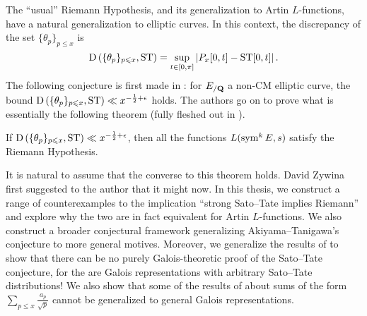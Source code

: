 The ``usual'' Riemann Hypothesis, and its generalization to Artin 
$L$-functions, have a natural generalization to elliptic curves. In this 
context, the discrepancy of the set $\{\theta_p\}_{p\leqslant x}$ is 
\[
	\operatorname{D}\left(\{\theta_p\}_{p\leqslant x},\mathrm{ST}\right) = \sup_{t\in [0,\pi]} \left| P_x[0,t] - \mathrm{ST}[0,t]\right| .
\]
The following conjecture is first made in \cite{akiyama-tanigawa-1999}: for 
$E_{/\mathbf{Q}}$ a non-CM elliptic curve, the bound 
$\operatorname{D}\left(\{\theta_p\}_{p\leqslant x},\mathrm{ST}\right)\ll x^{-\frac 1 2+\epsilon}$ 
holds. The authors go on to prove what is essentially the following theorem 
(fully fleshed out in \cite{mazur-2008}). 

\begin{theorem}
If $\operatorname{D}\left(\{\theta_p\}_{p\leqslant x},\mathrm{ST}\right)\ll x^{-\frac 1 2+\epsilon}$, 
then all the functions $L(\operatorname{sym}^k E, s)$ satisfy the Riemann Hypothesis. 
\end{theorem}

It is natural to assume that the converse to this theorem holds. David Zywina 
first suggested to the author that it might now. In this thesis, we construct a 
range of counterexamples to the implication ``strong Sato--Tate implies 
Riemann'' and explore why the two are in fact equivalent for Artin 
$L$-functions. We also construct a broader conjectural framework generalizing 
Akiyama--Tanigawa's conjecture to more general motives. Moreover, we generalize 
the results of \cite{pande-2011} to show that there can be no purely 
Galois-theoretic proof of the Sato--Tate conjecture, for the are Galois 
representations with arbitrary Sato--Tate distributions! We also show that 
some of the results of \cite{sarnak-2007} about sums of the form 
$\sum_{p\leqslant x} \frac{a_p}{\sqrt p}$ cannot be generalized to general 
Galois representations. 
